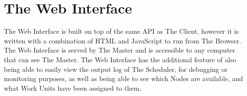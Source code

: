\section{The Web Interface}

The Web Interface is built on top of the same API as The Client, however it is written with a combination of HTML and JavaScript to run from The Browser. The Web Interface is served by The Master and is accessible to any computer that can see The Master. The Web Interface has the additional feature of also being able to easily view the output log of The Scheduler, for debugging or monitoring purposes, as well as being able to see which Nodes are available, and what Work Units have been assigned to them. 



